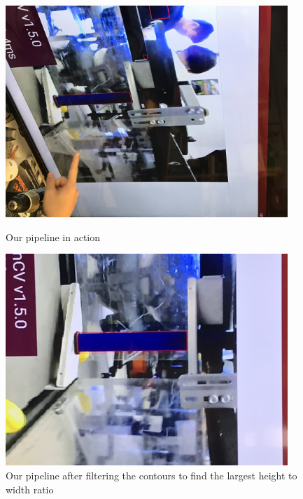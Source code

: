 \begin{figure}[ht]
\centering
\begin{minipage}[b]{.48\textwidth}
  \centering
  \includegraphics[width=0.95\textwidth]{Meetings/January/01-24-22/IMG_5646 - James Hu.JPG}
  \caption{Our pipeline in action}
  \label{fig:012422_1}
\end{minipage}%
\hfill%
\begin{minipage}[b]{.48\textwidth}
  \centering
  \includegraphics[width=0.95\textwidth]{Meetings/January/01-24-22/IMG_5648 - James Hu.JPG}
  \caption{Our pipeline after filtering the contours to find the largest height to width ratio}
  \label{fig:012422_2}
\end{minipage}
\end{figure}




